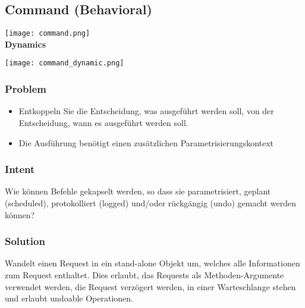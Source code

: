 \subsection{Command (Behavioral)}

\texttt{[image: command.png]} \\

\textbf{Dynamics}

\texttt{[image: command\_dynamic.png]}

\subsubsection{Problem}
\begin{itemize}
    \item Entkoppeln Sie die Entscheidung, was ausgeführt werden soll, von der Entscheidung, wann es ausgeführt werden soll.
    \item Die Ausführung benötigt einen zusätzlichen Parametrisierungskontext
\end{itemize}

\subsubsection{Intent}
Wie können Befehle gekapselt werden, so dass sie parametrisiert, geplant (scheduled), protokolliert (logged) und/oder rückgängig (undo) gemacht werden können?

\subsubsection{Solution}
Wandelt einen Request in ein stand-alone Objekt um, welches alle Informationen zum Request enthaltet. Dies erlaubt, das Requests als Methoden-Argumente verwendet werden, die Request verzögert werden, in einer Warteschlange stehen und erlaubt undoable Operationen.

